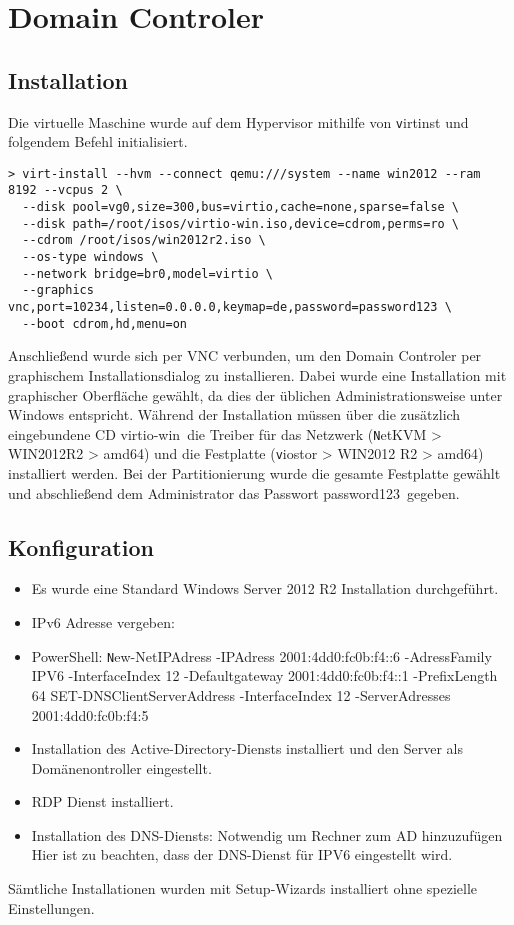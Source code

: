 \section{Domain Controler}

\subsection{Installation}

Die virtuelle Maschine wurde auf dem Hypervisor mithilfe von {\texttt virtinst} und folgendem Befehl initialisiert.

\begin{lstlisting}[numbers=none]
> virt-install --hvm --connect qemu:///system --name win2012 --ram 8192 --vcpus 2 \
  --disk pool=vg0,size=300,bus=virtio,cache=none,sparse=false \
  --disk path=/root/isos/virtio-win.iso,device=cdrom,perms=ro \
  --cdrom /root/isos/win2012r2.iso \
  --os-type windows \
  --network bridge=br0,model=virtio \
  --graphics vnc,port=10234,listen=0.0.0.0,keymap=de,password=password123 \
  --boot cdrom,hd,menu=on
\end{lstlisting}

Anschließend wurde sich per VNC verbunden, um den Domain Controler per graphischem Installationsdialog zu installieren. Dabei wurde eine Installation mit graphischer Oberfläche gewählt, da dies der üblichen Administrationsweise unter Windows entspricht. Während der Installation müssen über die zusätzlich eingebundene CD \ql virtio-win\qr\ die Treiber für das Netzwerk ({\texttt NetKVM > WIN2012R2 > amd64}) und die Festplatte ({\texttt viostor > WIN2012	R2 > amd64}) installiert werden. Bei der Partitionierung wurde die gesamte Festplatte gewählt und abschließend dem Administrator das Passwort \ql password123\qr\ gegeben.

\subsection{Konfiguration}

\begin{itemize}
	\item Es wurde eine Standard Windows Server 2012 R2 Installation durchgeführt.
	\item IPv6 Adresse vergeben:
	\item PowerShell: {\texttt New-NetIPAdress -IPAdress 2001:4dd0:fc0b:f4::6 -AdressFamily IPV6 -InterfaceIndex 12 -Defaultgateway 2001:4dd0:fc0b:f4::1 -PrefixLength 64
	SET-DNSClientServerAddress -InterfaceIndex 12 -ServerAdresses 2001:4dd0:fc0b:f4:5}
	\item Installation des Active-Directory-Diensts installiert und den Server als Domänenontroller eingestellt.
	\item RDP Dienst installiert.
	\item Installation des DNS-Diensts: Notwendig um Rechner zum AD hinzuzufügen
	Hier ist zu beachten, dass der DNS-Dienst für IPV6 eingestellt wird.
\end{itemize}

Sämtliche Installationen wurden mit Setup-Wizards installiert ohne spezielle Einstellungen.